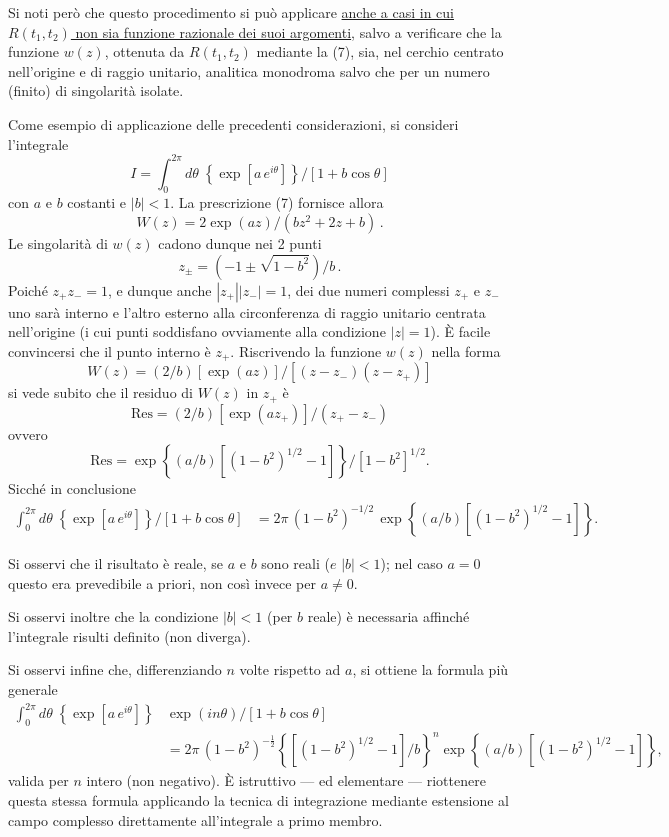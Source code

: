 \documentclass[11pt, a4paper]{book}
\numberwithin{equation}{section}
\begin{document}
Si noti però che questo procedimento si può applicare \uline{anche a casi in cui $R(t_1, t_2)$ non sia funzione razionale dei suoi argomenti}, salvo a verificare che la funzione $w(z)$, ottenuta da $R(t_1, t_2)$ mediante la (7), sia, nel cerchio centrato nell'origine e di raggio unitario, analitica monodroma salvo che per un numero (finito) di singolarità isolate.

Come esempio di applicazione delle precedenti considerazioni, si consideri l'integrale
\[
I = \int_0^{2\pi} d\theta\; \left\{\exp\!\left[a\,e^{i\theta}\right]\right\} \big/ \left[1 + b\cos\theta\right]
\]
con $a$ e $b$ costanti e $|b| < 1$. La prescrizione (7) fornisce allora
\[
W(z) = 2\exp(az) \big/ (bz^2 + 2z + b)\,.
\]
Le singolarità di $w(z)$ cadono dunque nei 2 punti
\[
z_{\pm} = \left(-1 \pm \sqrt{1-b^2}\right)\big/b\,.
\]
Poiché $z_+ z_- = 1$, e dunque anche $|z_+||z_-| = 1$, dei due numeri%
complessi $z_+$ e $z_-$ uno sarà interno e l'altro esterno alla circonferenza di raggio unitario centrata nell'origine (i cui punti soddisfano ovviamente alla condizione $|z|=1$). È facile convincersi che il punto interno è $z_+$. Riscrivendo la funzione $w(z)$ nella forma
\[
W(z) = (2/b)\left[\exp(az)\right] \big/ \left[(z-z_-)(z-z_+)\right]
\]
si vede subito che il residuo di $W(z)$ in $z_+$ è
\[
\mathrm{Res} = (2/b)\left[\exp(az_+)\right] \big/ (z_+ - z_-)
\]
ovvero
\[
\mathrm{Res} = \exp\!\left\{(a/b)\left[(1-b^2)^{1/2}-1\right]\right\} \big/ \left[1-b^2\right]^{1/2}.
\]
Sicché in conclusione
\begin{align*}
\int_0^{2\pi} d\theta\; \left\{\exp\!\left[a\,e^{i\theta}\right]\right\} \big/ \left[1+b\cos\theta\right]
&= 2\pi\,(1-b^2)^{-1/2}\,\exp\!\left\{(a/b)\left[(1-b^2)^{1/2}-1\right]\right\}.
\end{align*}

Si osservi che il risultato è reale, se $a$ e $b$ sono reali ($e$ $|b|<1$); nel caso $a=0$ questo era prevedibile a priori, non così invece per $a \neq 0$.

Si osservi inoltre che la condizione $|b|<1$ (per $b$ reale) è necessaria affinché l'integrale risulti definito (non diverga).

Si osservi infine che, differenziando $n$ volte rispetto ad $a$, si ottiene la formula più generale
\begin{align*}
\int_0^{2\pi} d\theta\; \left\{\exp\!\left[a\,e^{i\theta}\right]\right\} &\exp(in\theta) \big/ \left[1+b\cos\theta\right] \\
&= 2\pi\,(1-b^2)^{-\frac{1}{2}} \left\{\left[(1-b^2)^{1/2}-1\right]/b\right\}^n \exp\!\left\{(a/b)\left[(1-b^2)^{1/2}-1\right]\right\},
\end{align*}
valida per $n$ intero (non negativo). È istruttivo — ed elementare — riottenere questa stessa formula applicando la tecnica di integrazione mediante estensione al campo complesso direttamente all'integrale a primo membro.
\end{document}
